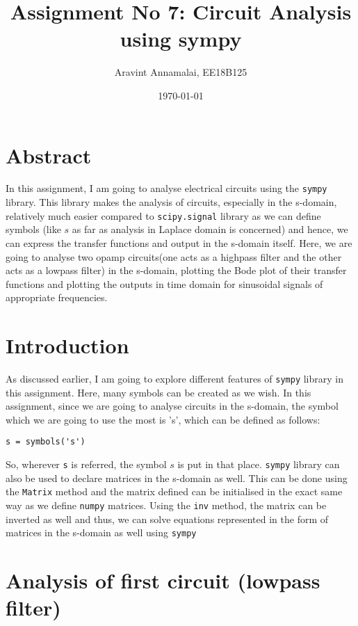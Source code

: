 \documentclass[11pt, a4paper]{article}
\title{Assignment No 7: Circuit Analysis using sympy} %
\author{Aravint Annamalai, EE18B125} %
\date{\today} %
\begin{document}
		
		
\maketitle %

\section{Abstract}
In this assignment, I am going to analyse electrical circuits using the \texttt{sympy} library. This library makes the analysis of circuits, especially in the s-domain, relatively much easier compared to \texttt{scipy.signal} library as we can define symbols (like \(s\) as far as analysis in Laplace domain is concerned) and hence, we can express the transfer functions and output in the s-domain itself. Here, we are going to analyse two opamp circuits(one acts as a highpass filter and the other acts as a lowpass filter) in the s-domain, plotting the Bode plot of their transfer functions and plotting the outputs in time domain for sinusoidal signals of appropriate frequencies.

\section{Introduction}
As discussed earlier, I am going to explore different features of \texttt{sympy} library in this assignment. Here, many symbols can be created as we wish. In this assignment, since we are going to analyse circuits in the s-domain, the symbol which we are going to use the most is 's', which can be defined as follows:
\begin{verbatim}
s = symbols('s')
\end{verbatim}
So, wherever \texttt{s} is referred, the symbol \(s\) is put in that place. \texttt{sympy} library can also be used to declare matrices in the s-domain as well. This can be done using the \texttt{Matrix} method and the matrix defined can be initialised in the exact same way as we define \texttt{numpy} matrices. Using the \texttt{inv} method, the matrix can be inverted as well and thus, we can solve equations represented in the form of matrices in the s-domain as well using \texttt{sympy}

\section{Analysis of first circuit (lowpass filter)}
\end{document}
